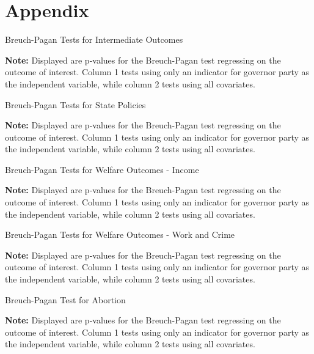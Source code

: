 \documentclass{article}
\begin{document}
\section{Appendix}


\begin{table}[!hbtp]
\caption{Breuch-Pagan Tests for Intermediate Outcomes}

\textbf{Note:} Displayed are p-values for the Breuch-Pagan test regressing on the outcome of interest. Column 1 tests using only an indicator for governor party as the independent variable, while column 2 tests using all covariates. 
\label{table:bp_outcome}
\end{table}

\begin{table}[!hbtp]
\caption{Breuch-Pagan Tests for State Policies}

\textbf{Note:} Displayed are p-values for the Breuch-Pagan test regressing on the outcome of interest. Column 1 tests using only an indicator for governor party as the independent variable, while column 2 tests using all covariates. 
\label{table:bp_policies}
\end{table}

\begin{table}[!hbtp]
\caption{Breuch-Pagan Tests for Welfare Outcomes - Income}

\textbf{Note:} Displayed are p-values for the Breuch-Pagan test regressing on the outcome of interest. Column 1 tests using only an indicator for governor party as the independent variable, while column 2 tests using all covariates. 
\label{table:bp_welfare1}
\end{table}

\begin{table}[!hbtp]
\caption{Breuch-Pagan Tests for Welfare Outcomes - Work and Crime}

\textbf{Note:} Displayed are p-values for the Breuch-Pagan test regressing on the outcome of interest. Column 1 tests using only an indicator for governor party as the independent variable, while column 2 tests using all covariates. 
\label{table:bp_welfare2}
\end{table}

\begin{table}[!hbtp]
\caption{Breuch-Pagan Test for Abortion}

\textbf{Note:} Displayed are p-values for the Breuch-Pagan test regressing on the outcome of interest. Column 1 tests using only an indicator for governor party as the independent variable, while column 2 tests using all covariates. 
\label{table:bp_abortion}
\end{table}
\end{document}
